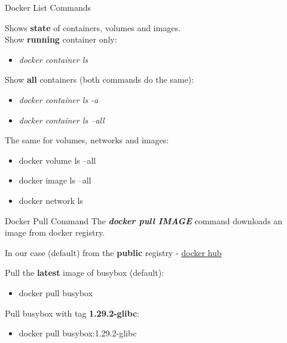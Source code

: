 \documentclass[10pt,aspectratio=\ratio,
compress
]{beamer}
\newcommand\meta{./meta}
\begin{document}
\begin{frame}{Docker List Commands}

Shows \textbf{state} of containers, volumes and images. \\

Show \textbf{running} container only:
\begin{itemize}
		\item \emph{docker container ls}
\end{itemize}

Show \textbf{all} containers (both commands do the same):
\begin{itemize}
	\item  \emph{docker container ls -a}
	\item  \emph{docker container ls --all}
\end{itemize}

The same for volumes, networks and images:
\begin{itemize}
	\item docker volume ls --all
    \item docker image ls --all
    \item docker network ls
\end{itemize}
\end{frame}

\begin{frame}{Docker Pull Command}
The \emph{\textbf{docker pull IMAGE}} command downloads an image from docker registry.

In our case (default) from the \textbf{public} registry - \href{https://hub.docker.com/}{docker hub}

Pull the \textbf{latest} image of busybox (default):
\begin{itemize}
	\item docker pull busybox
\end{itemize}

Pull busybox with tag \textbf{1.29.2-glibc}:
\begin{itemize}
	\item docker pull busybox:1.29.2-glibc
\end{itemize}
\end{frame}
\end{document}
